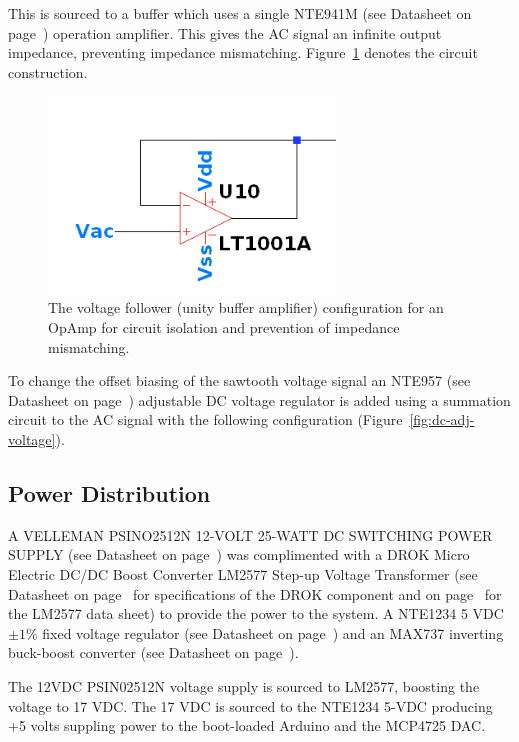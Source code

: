 \documentclass[12pt,journal]{IEEEtran}
\begin{document}
This is sourced to a buffer which uses a single NTE941M (see Datasheet on page~\pageref{datasheet:nte941m}) operation amplifier. This gives the AC signal an infinite output impedance, preventing impedance mismatching. Figure~\ref{fig:buffer} denotes the circuit construction.

\begin{figure}[h!]
  \centering
	\includegraphics[width=3in]{./ltspice/unity-buffer-ltspice.png}
	\caption[Cavity Mounts]{The voltage follower (unity buffer amplifier) configuration for an OpAmp for circuit isolation and prevention of impedance mismatching.}
	\label{fig:buffer}
\end{figure}  

To change the offset biasing of the sawtooth voltage signal an NTE957 (see Datasheet on page~\pageref{datasheet:nte957}) adjustable DC voltage regulator is added using a summation circuit to the AC signal with the following configuration (Figure~\ref{fig:dc-adj-voltage}).

\subsection{Power Distribution}

A VELLEMAN PSINO2512N 12-VOLT 25-WATT DC SWITCHING POWER SUPPLY (see Datasheet on page~\pageref{datasheet:psino2512n}) was complimented with a DROK Micro Electric DC/DC Boost Converter LM2577 Step-up Voltage Transformer (see Datasheet on page~\pageref{datasheet:drok} for specifications of the DROK component and on page~\pageref{datasheet:lm2577} for the LM2577 data sheet) to provide the power to the system. A NTE1234 5 VDC $\pm 1\%$ fixed voltage regulator (see Datasheet on page~\pageref{datasheet:nte941m}) and an MAX737 inverting buck-boost converter (see Datasheet on page~\pageref{datasheet:max737}). 

The 12VDC PSIN02512N voltage supply is sourced to LM2577, boosting the voltage to 17 VDC. The 17 VDC is sourced to the NTE1234 5-VDC producing +5 volts suppling power to the boot-loaded Arduino and the MCP4725 DAC. 
\end{document}
